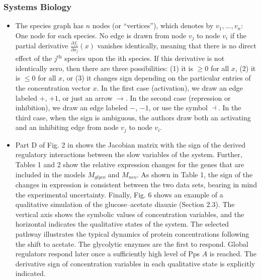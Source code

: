 \documentclass[11pt]{book}
\begin{document}
\subsubsection{Systems Biology}
\begin{itemize}
\item The species graph has $n$ nodes (or \textquotedblleft vertices\textquotedblright ),
which \cite{sontag2006monotone}
denotes by $v_{1},\ldots,v_{n}$: One node for each species. No edge
is drawn from node $v_{j}$ to node $v_{i}$ if the partial derivative
$\frac{\partial f_{i}}{\partial x_{j}}\left(x\right)$ vanishes identically,
meaning that there is no direct effect of the $j^{\text{th}}$ species
upon the ith species. If this derivative is not identically zero,
then there are three possibilities: (1) it is $\geq0$ for all $x$,
(2) it is $\leq0$ for all $x$, or (3) it changes sign depending
on the particular entries of the concentration vector $x$. In the
first case (activation), we draw an edge labeled $+$, $+1$, or just
an arrow $\rightarrow$. In the second case (repression or inhibition),
we draw an edge labeled $-$, $-1$, or use the symbol $\dashv$.
In the third case, when the sign is ambiguous, the authors draw both
an activating and an inhibiting edge from node $v_{j}$ to node $v_{i}$.
\item Part D of Fig. 2 in \cite{baldazzi2012importance}
shows the Jacobian matrix with the sign of the derived regulatory
interactions between the slow variables of the system. Further, Tables
1 and 2 show the relative expression changes for the genes that are
included in the models $M_{glyco}$ and $M_{neo}$. As shown in Table
1, the sign of the changes in expression is consistent between the
two data sets, bearing in mind the experimental uncertainty. Finally,
Fig. 6 shows an example of a qualitative simulation of the glucose--acetate
diauxie (Section 2.3). The vertical axis shows the symbolic values
of concentration variables, and the horizontal indicates the qualitative
states of the system. The selected pathway illustrates the typical
dynamics of protein concentrations following the shift to acetate.
The glycolytic enzymes are the first to respond. Global regulators
respond later once a sufficiently high level of Pps $A$ is reached.
The derivative sign of concentration variables in each qualitative
state is explicitly indicated.
\end{itemize}
\end{document}
